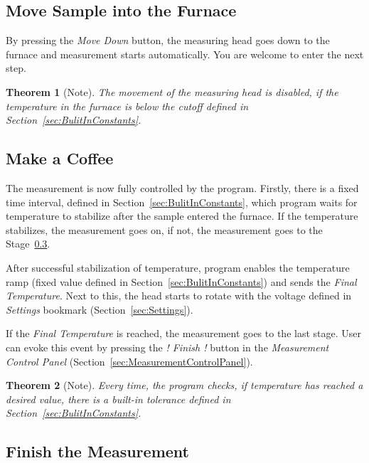 \documentclass[a4paper,11pt,oneside]{report}
\theoremstyle{named}
\newtheorem*{namedtheorem}{Theorem}
\begin{document}
\subsection{Move Sample into the Furnace}

By pressing the \textit{Move Down} button, the measuring head goes down to the
furnace and measurement starts automatically. You are welcome to enter the next
step. 

\begin{namedtheorem}[Note]
  The movement of the measuring head is disabled, if the temperature in the
  furnace is below the cutoff defined in Section~\ref{sec:BulitInConstants}.
\end{namedtheorem}

\subsection{Make a Coffee}

The measurement is now fully controlled by the program. Firstly, there is a fixed time
interval, defined in Section~\ref{sec:BulitInConstants}, which program waits for
temperature to stabilize after the sample entered the furnace. If the temperature
stabilizes, the measurement goes on, if not, the measurement goes to the
Stage~\ref{sec:FinishTheMeasurement}.

After successful stabilization of temperature, program enables the temperature
ramp (fixed value defined in Section~\ref{sec:BulitInConstants}) and sends the
\textit{Final Temperature}. Next to this, the head starts to rotate with the
voltage defined in \textit{Settings} bookmark (Section~\ref{sec:Settings}).

If the \textit{Final Temperature} is reached, the measurement goes to the last
stage. User can evoke this event by pressing the \textit{! Finish !} button in
the \textit{Measurement Control Panel}
(Section~\ref{sec:MeasurementControlPanel}).

\begin{namedtheorem}[Note]
  Every time, the program checks, if temperature has reached a desired value,
  there is a built-in tolerance defined in Section~\ref{sec:BulitInConstants}.
\end{namedtheorem}

\subsection{Finish the Measurement}
\label{sec:FinishTheMeasurement}
\end{document}
